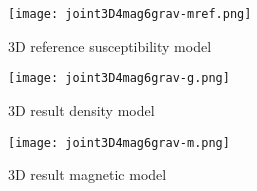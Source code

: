 \begin{figure}
\centering
\texttt{[image: joint3D4mag6grav-mref.png]}
\caption{3D reference susceptibility model}
\label{fig:joint3D4mag6grav-mref}
\end{figure}


\begin{figure}
\centering
\texttt{[image: joint3D4mag6grav-g.png]}
\caption{3D result density model}
\label{fig:joint3D4mag6grav-g}
\end{figure}


\begin{figure}
\centering
\texttt{[image: joint3D4mag6grav-m.png]}
\caption{3D result magnetic model}
\label{fig:joint3D4mag6grav-m}
\end{figure}

